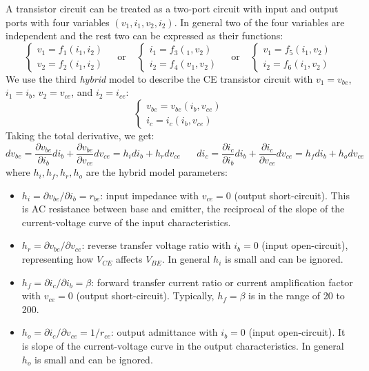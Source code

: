 A transistor circuit can be treated as a two-port circuit with input and output
ports with four variables $(v_1, i_1, v_2, i_2)$. In general two of the four
variables are independent and the rest two can be expressed as their functions:
\[
	\left\{ \begin{array}{l} v_1=f_1(i_1,i_2) \\ v_2=f_2(i_1,i_2)
	\end{array} \right.
	\;\;\;\;\mbox{or}\;\;\;\;
	\left\{ \begin{array}{l} i_1=f_3(_1,v_2) \\ i_2=f_4(v_1,v_2)
	\end{array} \right.
	\;\;\;\;\mbox{or}\;\;\;\;
	\left\{ \begin{array}{l} v_1=f_5(i_1,v_2) \\ i_2=f_6(i_1,v_2)
	\end{array} \right.
\]
We use the third {\em hybrid} model to describe the CE transistor circuit with 
$v_1=v_{be}$, $i_1=i_b$, $v_2=v_{ce}$, and $i_2=i_{ce}$:
\[
	\left\{ \begin{array}{l} v_{be}=v_{be}(i_b,v_{ce}) \\ i_c=i_c(i_b,v_{ce})
	\end{array} \right.
\]
Taking the total derivative, we get:
\[
	dv_{be}=\frac{\partial v_{be}}{\partial i_b} d i_b
	+\frac{\partial v_{be}}{\partial v_{ce}} d v_{ce} 
	=h_i d i_b+h_r d v_{ce}	
	\;\;\;\;\;\;
	di_c=\frac{\partial i_c}{\partial i_b} d i_b
	+\frac{\partial i_c}{\partial v_{ce}} d v_{ce} 
	=h_f d i_b+h_o d v_{ce}
\]
where $h_i, h_f, h_r, h_o$ are the hybrid model parameters:
\begin{itemize}
\item $h_i=\partial v_{be}/\partial i_b=r_{be}$: input impedance with 
  $v_{ce}=0$ (output short-circuit). This is AC resistance between base and 
  emitter, the reciprocal of the slope of the current-voltage curve of the 
  input characteristics. 

\item $h_r=\partial v_{be}/\partial v_{ce}$: reverse transfer voltage ratio
  with $i_b=0$ (input open-circuit), representing how $V_{CE}$ affects $V_{BE}$.
  In general $h_i$ is small and can be ignored.

\item $h_f=\partial i_c/\partial i_b=\beta$: forward transfer current 
    ratio or current amplification factor  with $v_{ce}=0$ (output 
    short-circuit). Typically, $h_f=\beta$ is in the range of 20 to 200.

\item $h_o=\partial i_c/\partial v_{ce}=1/r_{ce}$: output admittance with 
  $i_b=0$ (input open-circuit). It is slope of the current-voltage curve in 
  the output characteristics. In general $h_o$ is small and can be ignored.
\end{itemize}
